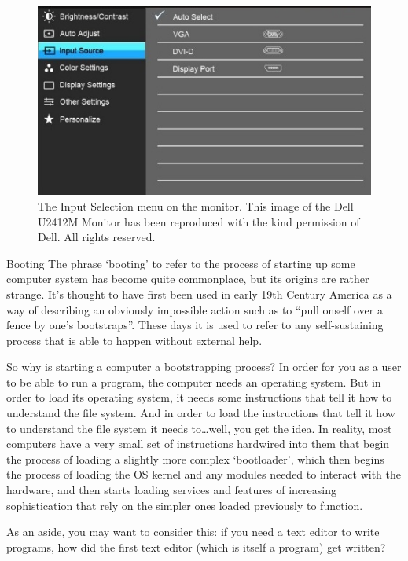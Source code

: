 \begin{figure}
\centerline{\includegraphics[width=12cm]{images/DellInputMenu.jpg}}
\caption{The Input Selection menu on the monitor. This image  of the Dell U2412M Monitor has been reproduced with the kind permission of Dell. All rights reserved.}\label{figure:monitorswitch}
\end{figure}

\begin{diversion}{Booting}
\label{bootbox}
The phrase `booting' to refer to the process of starting up some computer system has become quite commonplace, but its origins are rather strange. It's thought to have first been used in early 19th Century America as a way of describing an obviously impossible action such as to ``pull onself over a fence by one's bootstraps''. These days it is used to refer to any self-sustaining process that is able to happen without external help. 

So why is starting a computer a bootstrapping process? In order for you as a user to be able to run a program, the computer needs an operating system. But in order to load its operating system, it needs some instructions that tell it how to understand the file system. And in order to load the instructions that tell it how to understand the file system it needs to\ldots well, you get the idea. In reality, most computers have a very small set of instructions hardwired into them that begin the process of loading a  slightly more complex `bootloader', which then begins the process of loading the OS kernel and any modules needed to interact with the hardware, and then starts loading services and features of increasing sophistication that rely on the simpler ones loaded previously to function. 

As an aside, you may want to consider this: if you need a text editor to write programs, how did the first text editor (which is itself a program) get written?
\end{diversion}

